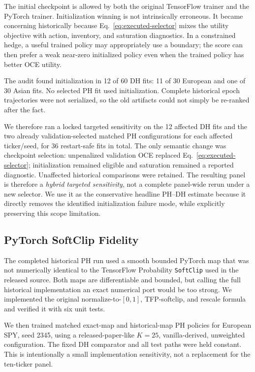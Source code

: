 \documentclass[conference]{IEEEtran}
\begin{document}
The initial checkpoint is allowed by both the original TensorFlow trainer and
the PyTorch trainer. Initialization winning is not intrinsically erroneous. It
became concerning historically because Eq.~\eqref{eq:executed-selector} mixes
the utility objective with action, inventory, and saturation diagnostics. In a
constrained hedge, a useful trained policy may appropriately use a boundary;
the score can then prefer a weak near-zero initialized policy even when the
trained policy has better OCE utility.

The audit found initialization in 12 of 60 DH fits: 11 of 30 European and one
of 30 Asian fits. No selected PH fit used initialization. Complete historical
epoch trajectories were not serialized, so the old artifacts could not simply
be re-ranked after the fact.

We therefore ran a locked targeted sensitivity on the 12 affected DH fits and
the two already validation-selected matched PH configurations for each affected
ticker/seed, for 36 restart-safe fits in total. The only semantic change was
checkpoint selection: unpenalized validation OCE replaced
Eq.~\eqref{eq:executed-selector}; initialization remained eligible and
saturation remained a reported diagnostic. Unaffected historical comparisons
were retained. The resulting panel is therefore a \emph{hybrid targeted
sensitivity}, not a complete panel-wide rerun under a new selector. We use it
as the conservative headline PH--DH estimate because it directly removes the
identified initialization failure mode, while explicitly preserving this
scope limitation.

\subsection{PyTorch SoftClip Fidelity}

The completed historical PH run used a smooth bounded PyTorch map that was not
numerically identical to the TensorFlow Probability \texttt{SoftClip} used in
the released source. Both maps are differentiable and bounded, but calling the
full historical implementation an exact numerical port would be too strong.
We implemented the original normalize-to-$[0,1]$, TFP-softclip, and rescale
formula and verified it with six unit tests.

We then trained matched exact-map and historical-map PH policies for European
SPY, seed 2345, using a released-paper-like $K=25$, vanilla-derived,
unweighted configuration. The fixed DH comparator and all test paths were held
constant. This is intentionally a small implementation sensitivity, not a
replacement for the ten-ticker panel.
\end{document}
